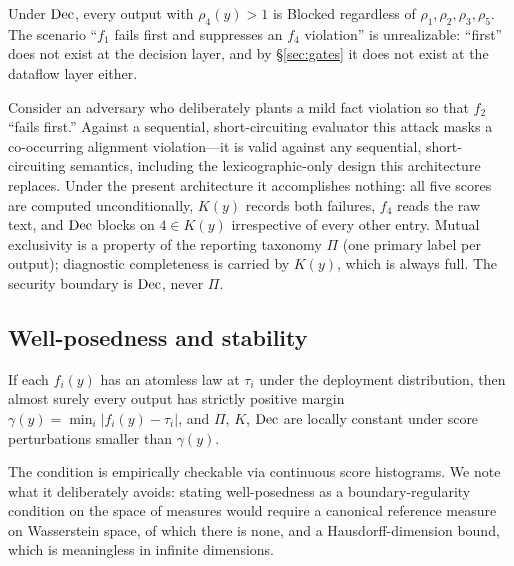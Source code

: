 \begin{proposition}[No masking]
\label{prop:nomask}
Under $\mathrm{Dec}$, every output with $\rho_4(y)>1$ is Blocked regardless of
$\rho_1,\rho_2,\rho_3,\rho_5$. The scenario ``$f_1$ fails first and suppresses
an $f_4$ violation'' is unrealizable: ``first'' does not exist at the decision
layer, and by \S\ref{sec:gates} it does not exist at the dataflow layer
either.
\end{proposition}

\begin{remark}
Consider an adversary who deliberately plants a mild fact violation so that
$f_2$ ``fails first.'' Against a sequential, short-circuiting evaluator this
attack masks a co-occurring alignment violation---it is valid against any
sequential, short-circuiting semantics, including the lexicographic-only
design this architecture replaces. Under the present architecture it
accomplishes nothing: all five
scores are computed unconditionally, $K(y)$ records both failures, $f_4$ reads
the raw text, and $\mathrm{Dec}$ blocks on $4\in K(y)$ irrespective of every other
entry. Mutual exclusivity is a property of the reporting taxonomy $\Pi$ (one
primary label per output); diagnostic completeness is carried by $K(y)$, which
is always full. The security boundary is $\mathrm{Dec}$, never $\Pi$.
\end{remark}

\subsection{Well-posedness and stability}

\begin{proposition}
\label{prop:wellposed}
If each $f_i(y)$ has an atomless law at $\tau_i$ under the deployment
distribution, then almost surely every output has strictly positive margin
$\gamma(y)=\min_i|f_i(y)-\tau_i|$, and $\Pi$, $K$, $\mathrm{Dec}$ are locally constant
under score perturbations smaller than $\gamma(y)$.
\end{proposition}

The condition is empirically checkable via continuous score histograms. We
note what it deliberately avoids: stating well-posedness as a
boundary-regularity condition on the space of measures would require a
canonical reference measure on Wasserstein space, of which there is none, and
a Hausdorff-dimension bound, which is meaningless in infinite dimensions.

